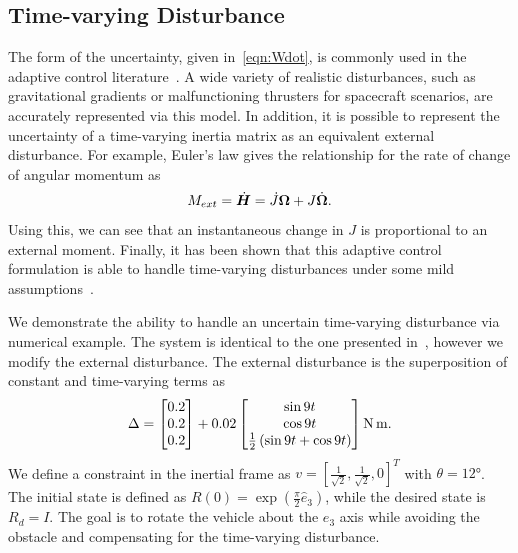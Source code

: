\documentclass[10pt,fleqn]{IJCAS}  %
\begin{document}
\begin{multicols}{2}
\subsection{Time-varying Disturbance}\label{ssec:time_varying}

The form of the uncertainty, given in~\cref{eqn:Wdot}, is commonly used in the adaptive control literature~\cite{LeeITCST13,ioannou2012}. 
A wide variety of realistic disturbances, such as gravitational gradients or malfunctioning thrusters for spacecraft scenarios, are accurately represented via this model. 
In addition, it is possible to represent the uncertainty of a time-varying inertia matrix as an equivalent external disturbance. 
For example, Euler's law gives the relationship for the rate of change of angular momentum as
\begin{align*}
    M_{ext} = \dot{\bm{H}} = \dot{J} \bm{\Omega} + J \dot{\bm{\Omega}} .
\end{align*}
Using this, we can see that an instantaneous change in \( J \) is proportional to an external moment.
Finally, it has been shown that this adaptive control formulation is able to handle time-varying disturbances under some mild assumptions~\cite{ioannou2012}. 

We demonstrate the ability to handle an uncertain time-varying disturbance via numerical example.
The system is identical to the one presented in~, however we modify the external disturbance. 
The external disturbance is the superposition of constant and time-varying terms as
\begin{align*}
    \Delta = \begin{bmatrix} 0.2 \\ 0.2 \\0.2 \end{bmatrix} + 0.02 \begin{bmatrix} \sin 9 t \\ \cos 9 t \\ \frac{1}{2} \left( \sin 9t + \cos 9t \right)\end{bmatrix} \si{\newton\meter}.
\end{align*}
We define a constraint in the inertial frame as \( v = [\frac{1}{\sqrt{2}}, \frac{1}{\sqrt{2}}, 0]^T \) with \( \theta = \ang{12} \).
The initial state is defined as \(R(0) = \exp( \frac{\pi}{2} \hat{e}_3) \), while the desired state is \(R_d =I \).
The goal is to rotate the vehicle about the \( e_3 \) axis while avoiding the obstacle and compensating for the time-varying disturbance. 


\end{multicols}
\end{document}
